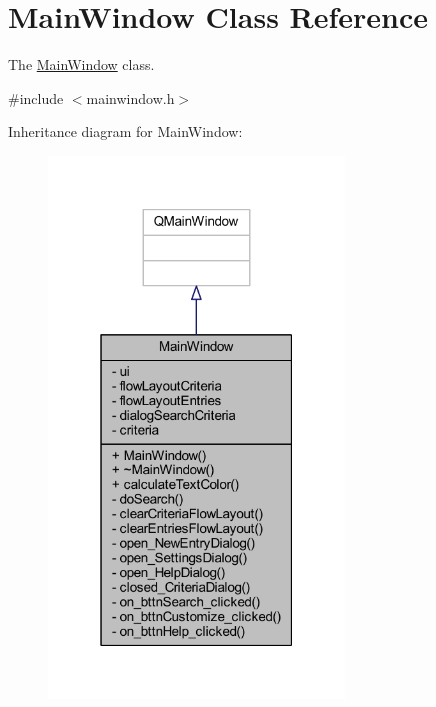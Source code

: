 \hypertarget{class_main_window}{\section{Main\+Window Class Reference}
\label{class_main_window}
}


The \hyperlink{class_main_window}{Main\+Window} class.  




{\ttfamily \#include $<$mainwindow.\+h$>$}



Inheritance diagram for Main\+Window\+:
\nopagebreak
\begin{figure}[H]
\begin{center}
\leavevmode
\includegraphics[width=223pt]{class_main_window__inherit__graph}
\end{center}
\end{figure}


